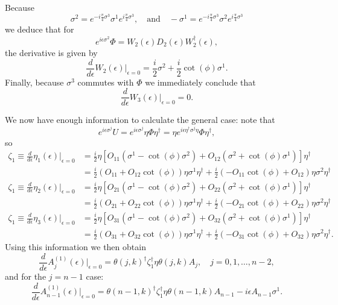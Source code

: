 \documentclass[12pt]{amsart}
\theoremstyle{definition}
\theoremstyle{remark}
\numberwithin{equation}{section}
\begin{document}
Because
\begin{equation}
	\sigma^2 = e^{-i\frac{\pi}{4}\sigma^3}\sigma^1e^{i\frac{\pi}{4}\sigma^3}, \quad \text{and}\quad -\sigma^1 = e^{-i\frac{\pi}{4}\sigma^3}\sigma^2e^{i\frac{\pi}{4}\sigma^3}
\end{equation}
we deduce that for 
\begin{equation}
	e^{i\epsilon \sigma^2}\Phi = W_2(\epsilon) D_2(\epsilon) W_2^\dag(\epsilon),
\end{equation}
the derivative is given by
\begin{equation}
	\frac{d}{d\epsilon} W_2(\epsilon)\bigg|_{\epsilon =0} = \frac{i}{2}\sigma^2 +\frac{i}{2}\cot(\phi)\sigma^1.
\end{equation}
Finally, because $\sigma^3$ commutes with $\Phi$ we immediately conclude that
\begin{equation}
	\frac{d}{d\epsilon} W_3(\epsilon)\bigg|_{\epsilon =0} = 0.
\end{equation}

We now have enough information to calculate the general case: note that
\begin{equation}
	e^{i\epsilon \sigma^j}U = e^{i\epsilon \sigma^j}\eta \Phi \eta^\dag = \eta e^{i\epsilon \eta^\dag \sigma^j\eta} \Phi \eta^\dag,
\end{equation}
so 
\begin{equation}
	\begin{split}
	\zeta_1 \equiv \frac{d}{d\epsilon} \eta_1(\epsilon)\bigg|_{\epsilon =0} &= \frac{i}{2}\eta \left[O_{11}(\sigma^1 - \cot(\phi)\sigma^2) + O_{12}(\sigma^2 +\cot(\phi)\sigma^1) \right] \eta^\dag \\
	&= \frac{i}{2} (O_{11} + O_{12}\cot(\phi))\eta\sigma^1 \eta^\dag  + \frac{i}{2}(-O_{11} \cot(\phi) + O_{12})\eta\sigma^2 \eta^\dag  \\
	\zeta_1 \equiv\frac{d}{d\epsilon} \eta_2(\epsilon)\bigg|_{\epsilon =0} &= \frac{i}{2}\eta \left[O_{21}(\sigma^1 - \cot(\phi)\sigma^2) + O_{22}(\sigma^2 +\cot(\phi)\sigma^1) \right] \eta^\dag \\
	&= \frac{i}{2} (O_{21} + O_{22}\cot(\phi))\eta\sigma^1 \eta^\dag  + \frac{i}{2}(-O_{21} \cot(\phi) + O_{22})\eta\sigma^2 \eta^\dag \\
	\zeta_1 \equiv\frac{d}{d\epsilon} \eta_3(\epsilon)\bigg|_{\epsilon =0} &= \frac{i}{2}\eta \left[O_{31}(\sigma^1 - \cot(\phi)\sigma^2) + O_{32}(\sigma^2 +	\cot(\phi)\sigma^1) \right] \eta^\dag \\
	&= \frac{i}{2} (O_{31} + O_{32}\cot(\phi))\eta\sigma^1 \eta^\dag  + \frac{i}{2}(-O_{31} \cot(\phi) + O_{32})\eta\sigma^2 \eta^\dag. 
	\end{split}
\end{equation}
Using this information we then obtain
\begin{equation}
	\frac{d}{d\epsilon} A_j^{(1)}(\epsilon)\bigg|_{\epsilon =0} = \theta(j,k)^\dag  \zeta_1^\dag\eta \theta(j,k) A_j, \quad j = 0, 1, \ldots, n-2,
\end{equation}
and for the $j=n-1$ case:
\begin{equation}
	\frac{d}{d\epsilon} A_{n-1}^{(1)}(\epsilon)\bigg|_{\epsilon =0} = \theta(n-1,k)^\dag  \zeta_1^\dag\eta \theta(n-1,k) A_{n-1}- i\epsilon A_{n-1} \sigma^1.
\end{equation}
\end{document}
